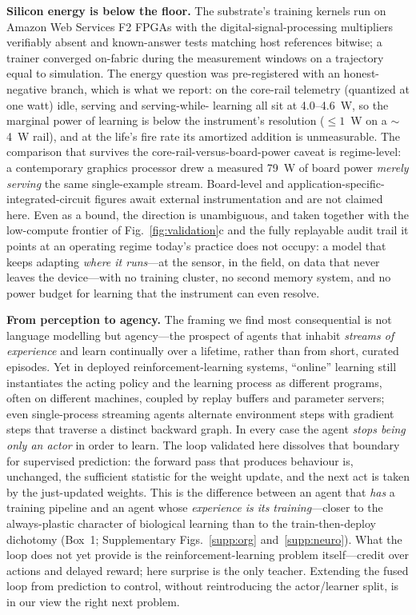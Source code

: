 \documentclass[sn-nature]{sn-jnl}   %
\newcommand{\heading}[1]{\vspace{4pt}\noindent\textbf{#1}\hspace{0.6em}}
\begin{document}
\heading{Silicon energy is below the floor.}
The substrate's training kernels run on Amazon Web Services F2 FPGAs with the
digital-signal-processing multipliers verifiably absent and known-answer tests
matching host references bitwise; a trainer converged on-fabric during the
measurement windows on a trajectory equal to simulation. The energy question was
pre-registered with an honest-negative branch, which is what we report: on the
core-rail telemetry (quantized at one watt) idle, serving and serving-while-%
learning all sit at 4.0--4.6~W, so the marginal power of learning is below the
instrument's resolution ($\le1$~W on a $\sim$4~W rail), and at the life's fire
rate its amortized addition is unmeasurable. The comparison that survives the
core-rail-versus-board-power caveat is regime-level: a contemporary graphics
processor drew a measured 79~W of board power \emph{merely serving} the same
single-example stream. Board-level and application-specific-integrated-circuit
figures await external instrumentation and are not claimed here. Even as a
bound, the direction is unambiguous, and taken together with the low-compute
frontier of Fig.~\ref{fig:validation}c and the fully replayable audit trail it
points at an operating regime today's practice does not occupy: a model that
keeps adapting \emph{where it runs}---at the sensor, in the field, on data that
never leaves the device---with no training cluster, no second memory system, and
no power budget for learning that the instrument can even resolve.

\heading{From perception to agency.}
The framing we find most consequential is not language modelling but agency---the
prospect of agents that inhabit \emph{streams of experience} and learn continually
over a lifetime, rather than from short, curated episodes\cite{silver2025experience}.
Yet in deployed reinforcement-learning systems, ``online'' learning still
instantiates the acting policy and the learning process as different programs,
often on different machines, coupled by replay buffers and parameter
servers\cite{espeholt2018impala,horgan2018distributed,sutton1991dyna}; even
single-process streaming agents alternate environment steps with gradient steps
that traverse a distinct backward graph\cite{elsayed2024streaming}. In every
case the agent \emph{stops being only an actor} in order to learn. The loop
validated here dissolves that boundary for supervised prediction: the forward
pass that produces behaviour is, unchanged, the sufficient statistic for the
weight update, and the next act is taken by the just-updated weights. This is the
difference between an agent that \emph{has} a training pipeline and an agent
whose \emph{experience is its training}---closer to the always-plastic character
of biological learning than to the train-then-deploy dichotomy (Box~1;
Supplementary Figs.~\ref{supp:org} and~\ref{supp:neuro}). What the
loop does not yet provide is the reinforcement-learning problem itself---credit
over actions and delayed reward; here surprise is the only teacher. Extending the
fused loop from prediction to control, without reintroducing the actor/learner
split, is in our view the right next problem.
\end{document}
